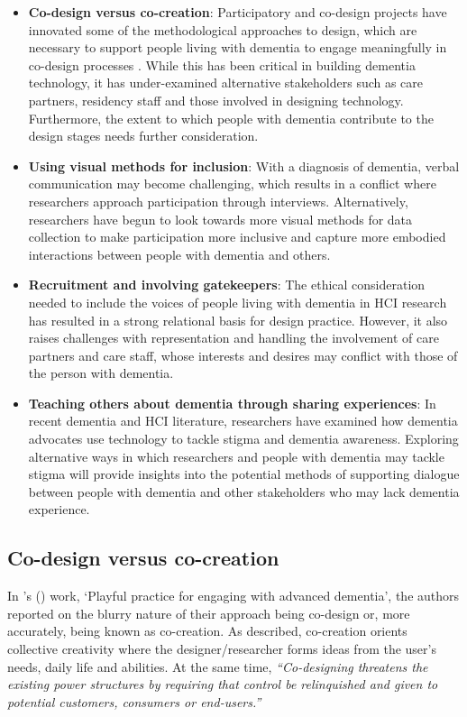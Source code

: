 \begin{itemize}
    \item \textbf{Co-design versus co-creation}: Participatory and co-design projects have innovated some of the methodological approaches to design, which are necessary to support people living with dementia to engage meaningfully in co-design processes \citep{branco_personalised_2017}. While this has been critical in building dementia technology, it has under-examined alternative stakeholders such as care partners, residency staff and those involved in designing technology. Furthermore, the extent to which people with dementia contribute to the design stages needs further consideration.
    
    \item \textbf{Using visual methods for inclusion}: With a diagnosis of dementia, verbal communication may become challenging, which results in a conflict where researchers approach participation through interviews. Alternatively, researchers have begun to look towards more visual methods for data collection to make participation more inclusive and capture more embodied interactions between people with dementia and others.

    \item \textbf{Recruitment and involving gatekeepers}: The ethical consideration needed to include the voices of people living with dementia in HCI research has resulted in a strong relational basis for design practice. However, it also raises challenges with representation and handling the involvement of care partners and care staff, whose interests and desires may conflict with those of the person with dementia. 
    
    \item \textbf{Teaching others about dementia through sharing experiences}: In recent dementia and HCI literature, researchers have examined how dementia advocates use technology to tackle stigma and dementia awareness. Exploring alternative ways in which researchers and people with dementia may tackle stigma will provide insights into the potential methods of supporting dialogue between people with dementia and other stakeholders who may lack dementia experience.
\end{itemize}

\subsection{Co-design versus co-creation}
In \citeauthor{tsekleves2020engaging}'s (\citeyear{tsekleves2020engaging}) work, `Playful practice for engaging with advanced dementia', the authors reported on the blurry nature of their approach being co-design or, more accurately, being known as co-creation. As \cite{sanders2008co} described, co-creation orients collective creativity where the designer/researcher forms ideas from the user's needs, daily life and abilities. At the same time, \textit{``Co-designing threatens the existing power structures by requiring that control be relinquished and given to potential customers, consumers or end-users.''}

